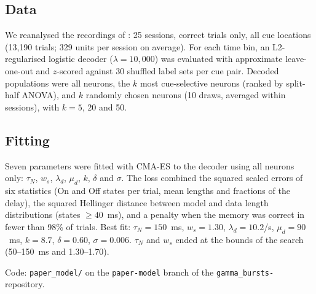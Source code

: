 \documentclass[11pt]{article}
\begin{document}
\subsection{Data}

We reanalysed the recordings of \citet{panichello2024}: 25 sessions, correct trials only, all cue locations (13,190 trials; 329 units per session on average).
For each time bin, an L2-regularised logistic decoder ($\lambda = 10{,}000$) was evaluated with approximate leave-one-out and $z$-scored against 30 shuffled label sets per cue pair.
Decoded populations were all neurons, the $k$ most cue-selective neurons (ranked by split-half ANOVA), and $k$ randomly chosen neurons (10 draws, averaged within sessions), with $k = 5$, 20 and 50.

\subsection{Fitting}

Seven parameters were fitted with CMA-ES to the decoder using all neurons only: $\tau_N$, $w_s$, $\lambda_d$, $\mu_d$, $k$, $\delta$ and $\sigma$.
The loss combined the squared scaled errors of six statistics (On and Off states per trial, mean lengths and fractions of the delay), the squared Hellinger distance between model and data length distributions (states $\geq 40$~ms), and a penalty when the memory was correct in fewer than 98\% of trials.
Best fit: $\tau_N = 150$~ms, $w_s = 1.30$, $\lambda_d = 10.2$/s, $\mu_d = 90$~ms, $k = 8.7$, $\delta = 0.60$, $\sigma = 0.006$.
$\tau_N$ and $w_s$ ended at the bounds of the search (50--150~ms and 1.30--1.70).

Code: \texttt{paper\_model/} on the \texttt{paper-model} branch of the \texttt{gamma\_bursts-} repository.



\end{document}
